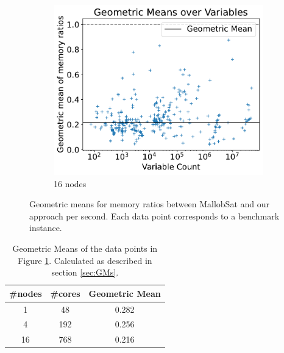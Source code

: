 \documentclass[12pt,a4paper,twoside]{scrartcl}
\numberwithin{equation}{section}
\begin{document}
\begin{figure}[!h]
\begin{subfigure}[c]{.45\textwidth}
    \center
    \includegraphics[scale=.45]{plots/16node_compare/mem_gm_over_vars.pdf}
    \caption{16 nodes}
  \end{subfigure}
  \caption{Geometric means for memory ratios between MallobSat and our approach per second. Each data point corresponds to a benchmark instance.}
  \label{fig:memGmVars}
\end{figure}

\begin{table}[!h]
  \center
  \begin{tabular}{ ccc }
    \toprule
    \#nodes & \#cores & Geometric Mean \\
    \midrule
    1  & 48  & 0.282\\
    4  & 192 & 0.256\\
    16 & 768 & 0.216\\
    \bottomrule
  \end{tabular}
  \caption{Geometric Means of the data points in Figure \ref{fig:memGmVars}. Calculated as described in section \ref{sec:GMs}.}
  \label{tab:memGM}
\end{table}
\end{document}
